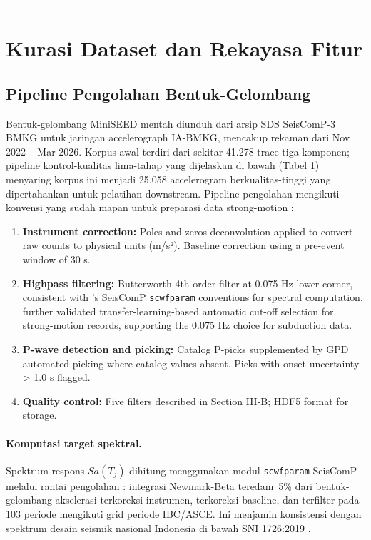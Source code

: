 \documentclass[10pt]{article}
\renewcommand{\cite}[1]{\citep{#1}}
\providecommand{\tightlist}{\setlength{\itemsep}{0pt}\setlength{\parskip}{0pt}}
\begin{document}
\begin{center}\rule{0.5\linewidth}{0.5pt}\end{center}

\section{Kurasi Dataset dan Rekayasa Fitur}

\subsection{Pipeline Pengolahan Bentuk-Gelombang}

Bentuk-gelombang MiniSEED mentah diunduh dari arsip SDS SeisComP-3 BMKG untuk jaringan accelerograph IA-BMKG, mencakup rekaman dari Nov 2022 -- Mar 2026. Korpus awal terdiri dari sekitar 41.278 trace tiga-komponen; pipeline kontrol-kualitas lima-tahap yang dijelaskan di bawah (Tabel 1) menyaring korpus ini menjadi 25.058 accelerogram berkualitas-tinggi yang dipertahankan untuk pelatihan downstream. Pipeline pengolahan mengikuti konvensi yang sudah mapan untuk preparasi data strong-motion \cite{ref67}:

\begin{enumerate}
\def\labelenumi{\arabic{enumi}.}
\tightlist
\item
 \textbf{Instrument correction:} Poles-and-zeros deconvolution applied to convert raw counts to physical units (m/s²). Baseline correction using a pre-event window of 30 s.
\item
 \textbf{Highpass filtering:} Butterworth 4th-order filter at 0.075 Hz lower corner, consistent with \citet{ref51}'s SeisComP \texttt{scwfparam} conventions for spectral computation. \citet{ref86} further validated transfer-learning-based automatic cut-off selection for strong-motion records, supporting the 0.075 Hz choice for subduction data.
\item
 \textbf{P-wave detection and picking:} Catalog P-picks supplemented by GPD automated picking \cite{ref42} where catalog values absent. Picks with onset uncertainty \textgreater{} 1.0 s flagged.
\item
 \textbf{Quality control:} Five filters described in Section III-B; \citet{ref52} HDF5 format for storage.
\end{enumerate}

\paragraph{Komputasi target spektral.} Spektrum respons \(Sa(T_j)\) dihitung menggunakan modul \texttt{scwfparam} SeisComP melalui rantai pengolahan \citet{ref51}: integrasi Newmark-Beta teredam~5\% dari bentuk-gelombang akselerasi terkoreksi-instrumen, terkoreksi-baseline, dan terfilter pada 103 periode mengikuti grid periode IBC/ASCE. Ini menjamin konsistensi dengan spektrum desain seismik nasional Indonesia di bawah SNI 1726:2019 \cite{ref12}.
\end{document}
